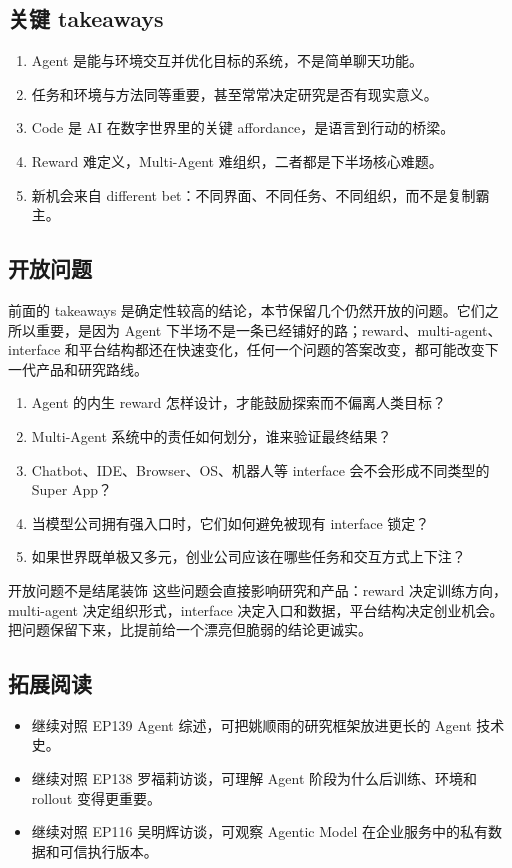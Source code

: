 \documentclass[a4paper]{article}
\begin{document}
\subsection{关键 takeaways}

\begin{enumerate}
\item Agent 是能与环境交互并优化目标的系统，不是简单聊天功能。
\item 任务和环境与方法同等重要，甚至常常决定研究是否有现实意义。
\item Code 是 AI 在数字世界里的关键 affordance，是语言到行动的桥梁。
\item Reward 难定义，Multi-Agent 难组织，二者都是下半场核心难题。
\item 新机会来自 different bet：不同界面、不同任务、不同组织，而不是复制霸主。
\end{enumerate}

\subsection{开放问题}

前面的 takeaways 是确定性较高的结论，本节保留几个仍然开放的问题。它们之所以重要，是因为 Agent 下半场不是一条已经铺好的路；reward、multi-agent、interface 和平台结构都还在快速变化，任何一个问题的答案改变，都可能改变下一代产品和研究路线。

\begin{enumerate}
\item Agent 的内生 reward 怎样设计，才能鼓励探索而不偏离人类目标？
\item Multi-Agent 系统中的责任如何划分，谁来验证最终结果？
\item Chatbot、IDE、Browser、OS、机器人等 interface 会不会形成不同类型的 Super App？
\item 当模型公司拥有强入口时，它们如何避免被现有 interface 锁定？
\item 如果世界既单极又多元，创业公司应该在哪些任务和交互方式上下注？
\end{enumerate}

\begin{warningbox}{开放问题不是结尾装饰}
这些问题会直接影响研究和产品：reward 决定训练方向，multi-agent 决定组织形式，interface 决定入口和数据，平台结构决定创业机会。把问题保留下来，比提前给一个漂亮但脆弱的结论更诚实。
\end{warningbox}

\subsection{拓展阅读}

\begin{itemize}
\item 继续对照 EP139 Agent 综述，可把姚顺雨的研究框架放进更长的 Agent 技术史。
\item 继续对照 EP138 罗福莉访谈，可理解 Agent 阶段为什么后训练、环境和 rollout 变得更重要。
\item 继续对照 EP116 吴明辉访谈，可观察 Agentic Model 在企业服务中的私有数据和可信执行版本。
\end{itemize}
\end{document}
